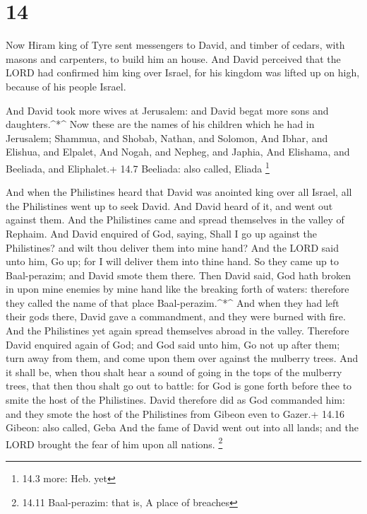 \hypertarget{section-13}{%
\section{14}\label{section-13}}

 Now Hiram king of Tyre sent messengers to David, and timber
of cedars, with masons and carpenters, to build him an house.
 And David perceived that the LORD had confirmed him king
over Israel, for his kingdom was lifted up on high, because of his
people Israel.

 And David took more wives at Jerusalem: and David begat
more sons and daughters.\^{}*\^{}  Now these are the names
of his children which he had in Jerusalem; Shammua, and Shobab, Nathan,
and Solomon,  And Ibhar, and Elishua, and Elpalet,
 And Nogah, and Nepheg, and Japhia,  And
Elishama, and Beeliada, and Eliphalet.+ 14.7 Beeliada: also called,
Eliada \footnote{14.3 more: Heb. yet}

 And when the Philistines heard that David was anointed king
over all Israel, all the Philistines went up to seek David. And David
heard of it, and went out against them.  And the Philistines
came and spread themselves in the valley of Rephaim.  And
David enquired of God, saying, Shall I go up against the Philistines?
and wilt thou deliver them into mine hand? And the LORD said unto him,
Go up; for I will deliver them into thine hand.  So they
came up to Baal-perazim; and David smote them there. Then David said,
God hath broken in upon mine enemies by mine hand like the breaking
forth of waters: therefore they called the name of that place
Baal-perazim.\^{}*\^{}  And when they had left their gods
there, David gave a commandment, and they were burned with fire.
 And the Philistines yet again spread themselves abroad in
the valley.  Therefore David enquired again of God; and God
said unto him, Go not up after them; turn away from them, and come upon
them over against the mulberry trees.  And it shall be,
when thou shalt hear a sound of going in the tops of the mulberry trees,
that then thou shalt go out to battle: for God is gone forth before thee
to smite the host of the Philistines.  David therefore did
as God commanded him: and they smote the host of the Philistines from
Gibeon even to Gazer.+ 14.16 Gibeon: also called, Geba  And
the fame of David went out into all lands; and the LORD brought the fear
of him upon all nations. \footnote{14.11 Baal-perazim: that is, A place
  of breaches}

